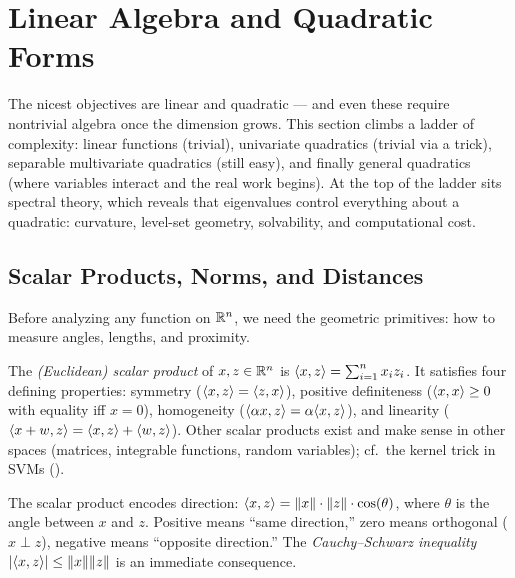 \section{Linear Algebra and Quadratic Forms}\label{sec:spectral}

The nicest objectives are linear and quadratic --- and even these require nontrivial algebra once the dimension grows.
This section climbs a ladder of complexity: linear functions (trivial), univariate quadratics (trivial via a trick), separable multivariate quadratics (still easy), and finally general quadratics (where variables interact and the real work begins).
At the top of the ladder sits spectral theory, which reveals that eigenvalues control everything about a quadratic: curvature, level-set geometry, solvability, and computational cost.


\subsection{Scalar Products, Norms, and Distances}\label{ssec:inner-product}

Before analyzing any function on $\mathbb{R}^n$, we need the geometric primitives: how to measure angles, lengths, and proximity.

\begin{defn}\label{def:scalar-product}
	The \textit{(Euclidean) scalar product} of $x, z \in \mathbb{R}^n$ is
	$\langle x, z\rangle = \sum_{i=1}^{n} x_i z_i$.
	It satisfies four defining properties:
	symmetry ($\langle x, z\rangle = \langle z, x\rangle$),
	positive definiteness ($\langle x, x\rangle \geq 0$ with equality iff $x = 0$),
	homogeneity ($\langle\alpha x, z\rangle = \alpha \langle x, z\rangle$),
	and linearity ($\langle x + w, z\rangle = \langle x, z\rangle + \langle w, z\rangle$).
	Other scalar products exist and make sense in other spaces (matrices, integrable functions, random variables); cf.\ the kernel trick in SVMs ().
\end{defn}

The scalar product encodes direction: $\langle x, z\rangle = \lVert x\rVert \cdot \lVert z\rVert \cdot \cos(\theta)$, where $\theta$ is the angle between $x$ and $z$.
Positive means ``same direction,'' zero means orthogonal ($x \perp z$), negative means ``opposite direction.''
The \textit{Cauchy--Schwarz inequality} $\lvert\langle x, z\rangle\rvert \leq \lVert x\rVert \lVert z\rVert$ is an immediate consequence.

